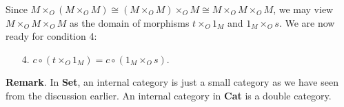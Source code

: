\documentclass[12pt]{article}
\begin{document}
Since $M \times_O (M \times_O M) \cong (M\times_O M)\times_O M \cong M\times_O M \times_O M$, we may view $M\times_O M \times_O M$ as the domain of morphisms $t \times_O 1_M$ and $1_M \times_O s$.  We are now ready for condition 4:
\begin{enumerate}
\item[4.] $c\circ (t \times_O 1_M) = c\circ (1_M \times_O s)$.
\end{enumerate}

\textbf{Remark}.  In \textbf{Set}, an internal category is just a small category as we have seen from the discussion earlier.  An internal category in \textbf{Cat} is a double category.
\end{document}
